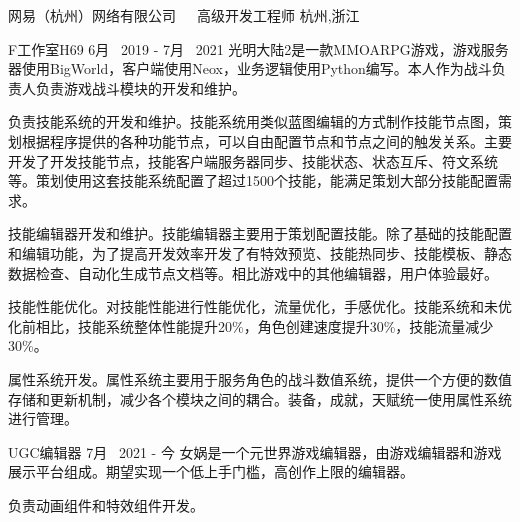 


\begin{cventries}

\cventrycompany
{网易（杭州）网络有限公司~~~高级开发工程师} %
{杭州,浙江} %

\cventryproject
{F工作室H69} %
{6月~ 2019 - 7月~ 2021} %
{光明大陆2是一款MMOARPG游戏，游戏服务器使用BigWorld，客户端使用Neox，业务逻辑使用Python编写。本人作为战斗负责人负责游戏战斗模块的开发和维护。}
{ %
	\begin{cvitems}
		\item {负责技能系统的开发和维护。技能系统用类似蓝图编辑的方式制作技能节点图，策划根据程序提供的各种功能节点，可以自由配置节点和节点之间的触发关系。主要开发了开发技能节点，技能客户端服务器同步、技能状态、状态互斥、符文系统等。策划使用这套技能系统配置了超过1500个技能，能满足策划大部分技能配置需求。}
		\item{技能编辑器开发和维护。技能编辑器主要用于策划配置技能。除了基础的技能配置和编辑功能，为了提高开发效率开发了有特效预览、技能热同步、技能模板、静态数据检查、自动化生成节点文档等。相比游戏中的其他编辑器，用户体验最好。}
		\item{技能性能优化。对技能性能进行性能优化，流量优化，手感优化。技能系统和未优化前相比，技能系统整体性能提升20\%，角色创建速度提升30\%，技能流量减少30\%。}
		\item{属性系统开发。属性系统主要用于服务角色的战斗数值系统，提供一个方便的数值存储和更新机制，减少各个模块之间的耦合。装备，成就，天赋统一使用属性系统进行管理。}
	\end{cvitems}
}

\cventryproject
{UGC编辑器} %
{7月~ 2021 - 今} %
{女娲是一个元世界游戏编辑器，由游戏编辑器和游戏展示平台组成。期望实现一个低上手门槛，高创作上限的编辑器。}
{ %
	\begin{cvitems}
		\item {负责动画组件和特效组件开发。}
	\end{cvitems}
}


\end{cventries}
